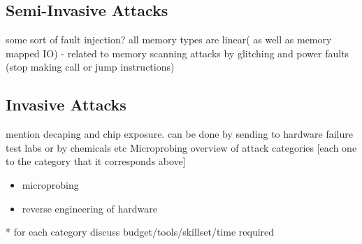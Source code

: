 \documentclass[10pt,journal,compsoc]{IEEEtran}
\begin{document}
	\subsection{Semi-Invasive Attacks}
	some sort of fault injection?
		all memory types are linear( as well as memory mapped IO) - related to memory scanning attacks by glitching and power faults (stop making call or jump instructions)
	\subsection{Invasive Attacks}
	mention decaping and chip exposure. can be done by sending to hardware failure test labs\citep{website:hacking_the_pic} or by chemicals etc \citep{anderson:cautionary_note}
	Microprobing
	overview of attack categories [each one to the category that it corresponds above]
	\begin{itemize}
		\item microprobing \\
		\item reverse engineering of hardware\\
	\end{itemize}
	
	* for each category discuss budget/tools/skillset/time required\\




	
	
		
	
\end{document}
